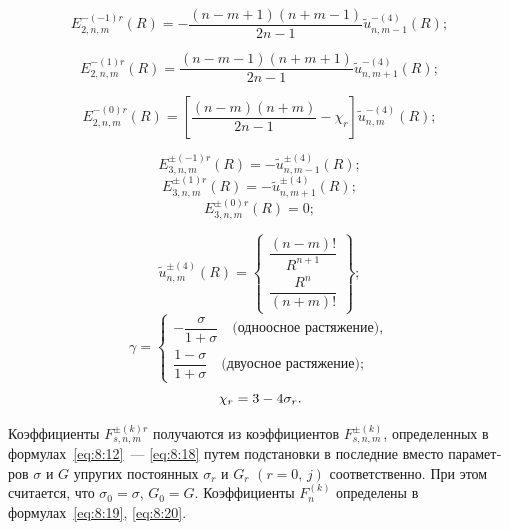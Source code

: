 \begin{russian}
\begin{equation}
E_{2,n,m}^{ - ( - 1)r}(R) =  - \frac{{(n - m + 1)(n + m - 1)}}{{2n - 1}}\tilde u_{n,m - 1}^{ - (4)}(R);
\end{equation}

\begin{equation}
E_{2,n,m}^{ - (1)r}(R) = \frac{{(n - m - 1)(n + m + 1)}}{{2n - 1}}\tilde u_{n,m + 1}^{ - (4)}(R);
\end{equation}

\begin{equation}
E_{2,n,m}^{ - (0)r}(R) = \left[ {\frac{{(n - m)(n + m)}}{{2n - 1}} - {\chi _r}} \right]\tilde u_{n,m}^{ - (4)}(R);
\end{equation}

\begin{equation}
E_{3,n,m}^{ \pm ( - 1)r}(R) =  - \tilde u_{n,m - 1}^{ \pm (4)}(R);
\end{equation}
\begin{equation}
E_{3,n,m}^{ \pm (1)r}(R) =  - \tilde u_{n,m + 1}^{ \pm (4)}(R);
\end{equation}
\begin{equation}
E_{3,n,m}^{ \pm (0)r}(R) = 0;
\end{equation}

\begin{equation}
\tilde u_{n,m}^{ \pm (4)}(R) = \left\{ \begin{array}{l}
\dfrac{{(n - m)!}}{{{R^{n + 1}}}}\\
\dfrac{{{R^n}}}{{(n + m)!}}
\end{array} \right\};
\label{eq:8:21a}
\end{equation}
\begin{equation}
\gamma  = \left\{ {\begin{array}{*{20}{l}}
{ - \dfrac{\sigma }{{1 + \sigma }}\quad\text{(одноосное растяжение)}},\\
{\dfrac{{1 - \sigma }}{{1 + \sigma }}\quad\text{(двуосное растяжение)}};
\end{array}} \right.
\label{eq:8:21b}
\end{equation}
$$
{\kern 1pt} {\chi _r} = 3 - 4{\sigma _r}.
$$

Коэффициенты $F_{s,n,m}^{\pm(k)r}$ получаются из коэффициентов $F_{s,n,m}^{\pm(k)}$, определенных в формулах~\eqref{eq:8:12}~--- \eqref{eq:8:18} путем подстановки в последние вместо параметров $\sigma$ и $G$ упругих постоянных $\sigma_r$ и $G_r$ $(r=0,\,j)$ соответственно. При этом считается, что $\sigma_0=\sigma$, $G_0=G$. Коэффициенты $F_n^{(k)}$ определены в формулах~\eqref{eq:8:19}, \eqref{eq:8:20}.


\end{russian}
